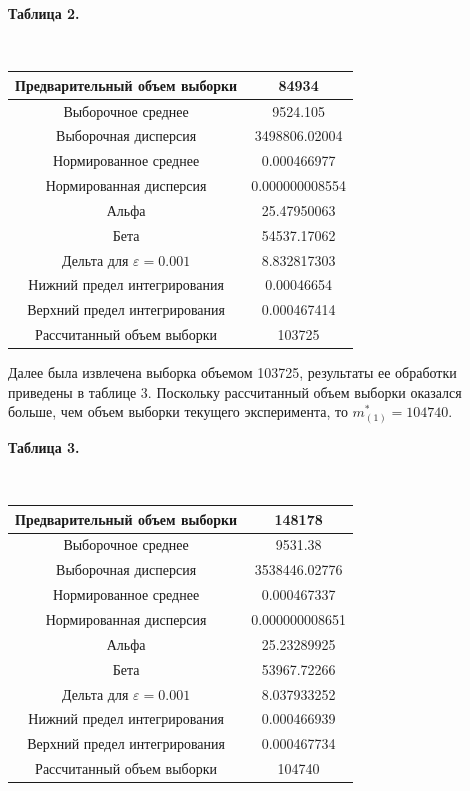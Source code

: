 \documentclass[a4paper, article, 14pt]{extarticle}
\begin{document}
\begin{center}\label{table2}
	\begin{small}
		\textbf{Таблица 2.}
	\end{small}\\
	\hfill \break
	\begin{tabular}{|c|c|}
		\hline
		Предварительный объем выборки & 84934\\
		\hline
		Выборочное среднее & 9524.105\\
		\hline
		Выборочная дисперсия & 3498806.02004\\
		\hline
		Нормированное среднее & 0.000466977\\
		\hline
		Нормированная дисперсия & 0.000000008554\\
		\hline
		Альфа & 25.47950063\\
		\hline
		Бета & 54537.17062\\
		\hline
		Дельта для $\varepsilon = 0.001$ & 8.832817303\\
		\hline
		Нижний предел интегрирования & 0.00046654\\
		\hline
		Верхний предел интегрирования & 0.000467414\\
		\hline
		Рассчитанный объем выборки & 103725\\
		\hline
	\end{tabular}
\end{center}

Далее была извлечена выборка объемом 103725, результаты ее обработки приведены в таблице 3. Поскольку рассчитанный объем выборки оказался больше, чем объем выборки текущего эксперимента, то $m_{(1)}^* = 104740$.

\begin{center}\label{table3}
	\begin{small}
		\textbf{Таблица 3.}
	\end{small}\\
	\hfill \break
	\begin{tabular}{|c|c|}
		\hline
		Предварительный объем выборки & 148178\\
		\hline
		Выборочное среднее & 9531.38\\
		\hline
		Выборочная дисперсия & 3538446.02776\\
		\hline
		Нормированное среднее & 0.000467337\\
		\hline
		Нормированная дисперсия & 0.000000008651\\
		\hline
		Альфа & 25.23289925\\
		\hline
		Бета & 53967.72266\\
		\hline
		Дельта для $\varepsilon = 0.001$ & 8.037933252\\
		\hline
		Нижний предел интегрирования & 0.000466939\\
		\hline
		Верхний предел интегрирования & 0.000467734\\
		\hline
		Рассчитанный объем выборки & 104740\\
		\hline
	\end{tabular}
\end{center}
\end{document}

